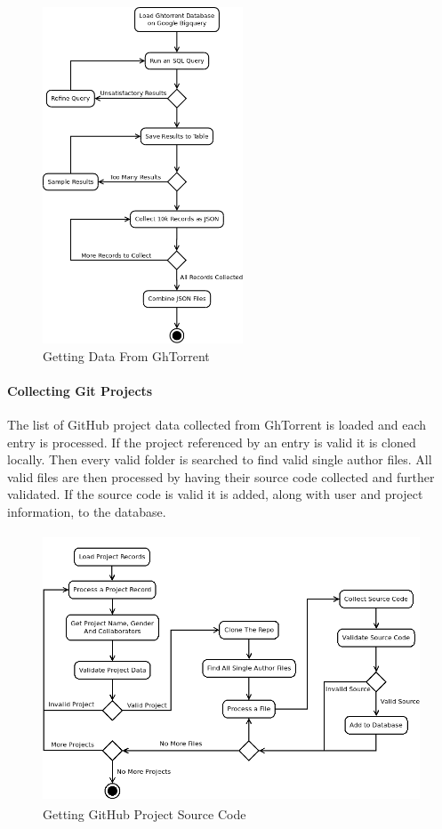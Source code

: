 \documentclass{article}
\begin{document}
\begin{figure}[!h]
    \centering
    \includegraphics[height=10cm]{diagrams/ght_process.png}
    \caption{Getting Data From GhTorrent}
\end{figure}

\paragraph{Collecting Git Projects}
The list of GitHub project data collected from GhTorrent is loaded and each entry is processed. If the project referenced by an entry is valid it is cloned locally. Then every valid folder is searched to find valid single author files. All valid files are then processed by having their source code collected and further validated. If the source code is valid it is added, along with user and project information, to the database.

\begin{figure}[!h]
    \centering
    \includegraphics[height=8cm]{diagrams/projects.png}
    \caption{Getting GitHub Project Source Code}
\end{figure}
\end{document}
